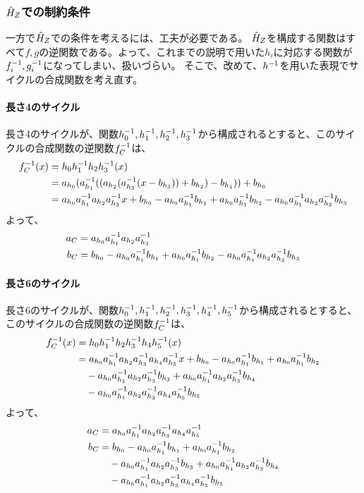 \documentclass[a4paper,11pt,dvipdfmx]{jsarticle}
\theoremstyle{definition}
\begin{document}
\subsubsection{$\hat{H}_Z$での制約条件}
一方で$\hat{H}_Z$での条件を考えるには、工夫が必要である。
$\hat{H}_Z$を構成する関数はすべて$f,g$の逆関数である。よって、これまでの説明で用いた$h_i$に対応する関数が$f_i^{-1}, g_i^{-1}$になってしまい、扱いづらい。
そこで、改めて、$h^{-1}$を用いた表現でサイクルの合成関数を考え直す。

\paragraph{長さ4のサイクル}
長さ4のサイクルが、関数$h_0^{-1}, h_1^{-1}, h_2^{-1}, h_3^{-1}$から構成されるとすると、このサイクルの合成関数の逆関数$f_C^{-1}$は、
\begin{align}
  f_C^{-1}(x) &= h_0 h_1^{-1} h_2 h_3^{-1}(x)\\
  &=a_{h_0}(a_{h_1}^{-1}((a_{h_2}(a_{h_3}^{-1}(x - b_{h_3})) + b_{h_2})-b_{h_1})) + b_{h_0}\\
  &= a_{h_0}a_{h_1}^{-1} a_{h_2}a_{h_3}^{-1} x + b_{h_0} - a_{h_0}a_{h_1}^{-1} b_{h_1} + a_{h_0}a_{h_1}^{-1} b_{h_2} - a_{h_0}a_{h_1}^{-1} a_{h_2}a_{h_3}^{-1} b_{h_3} 
\end{align}
よって、
\begin{align}
  a_C &= a_{h_0}a_{h_1}^{-1} a_{h_2}a_{h_3}^{-1}\\
  b_C &= b_{h_0} - a_{h_0}a_{h_1}^{-1} b_{h_1} + a_{h_0}a_{h_1}^{-1} b_{h_2} - a_{h_0}a_{h_1}^{-1} a_{h_2}a_{h_3}^{-1} b_{h_3}
\end{align}

\paragraph{長さ6のサイクル}
長さ6のサイクルが、関数$h_0^{-1}, h_1^{-1}, h_2^{-1}, h_3^{-1}, h_4^{-1}, h_5^{-1}$から構成されるとすると、このサイクルの合成関数の逆関数$f_C^{-1}$は、
\begin{align}
  f_C^{-1}(x) &= h_0 h_1^{-1} h_2 h_3^{-1} h_4 h_5^{-1}(x)\\
  &= a_{h_0}a_{h_1}^{-1} a_{h_2}a_{h_3}^{-1} a_{h_4} a_{h_5}^{-1} x + b_{h_0} - a_{h_0}a_{h_1}^{-1} b_{h_1} + a_{h_0}a_{h_1}^{-1} b_{h_2}\\
  &\quad - a_{h_0}a_{h_1}^{-1} a_{h_2}a_{h_3}^{-1} b_{h_3} + a_{h_0}a_{h_1}^{-1} a_{h_2}a_{h_3}^{-1} b_{h_4}\\
  &\quad - a_{h_0}a_{h_1}^{-1} a_{h_2}a_{h_3}^{-1} a_{h_4}a_{h_5}^{-1} b_{h_5}
\end{align}
よって、
\begin{align}
  a_C &= a_{h_0}a_{h_1}^{-1} a_{h_2}a_{h_3}^{-1} a_{h_4} a_{h_5}^{-1}\\
  b_C &= b_{h_0} - a_{h_0}a_{h_1}^{-1} b_{h_1} + a_{h_0}a_{h_1}^{-1} b_{h_2}\\
  &\quad - a_{h_0}a_{h_1}^{-1} a_{h_2}a_{h_3}^{-1} b_{h_3} + a_{h_0}a_{h_1}^{-1} a_{h_2}a_{h_3}^{-1} b_{h_4}\\
  &\quad - a_{h_0}a_{h_1}^{-1} a_{h_2}a_{h_3}^{-1} a_{h_4}a_{h_5}^{-1} b_{h_5}
\end{align}
\end{document}
